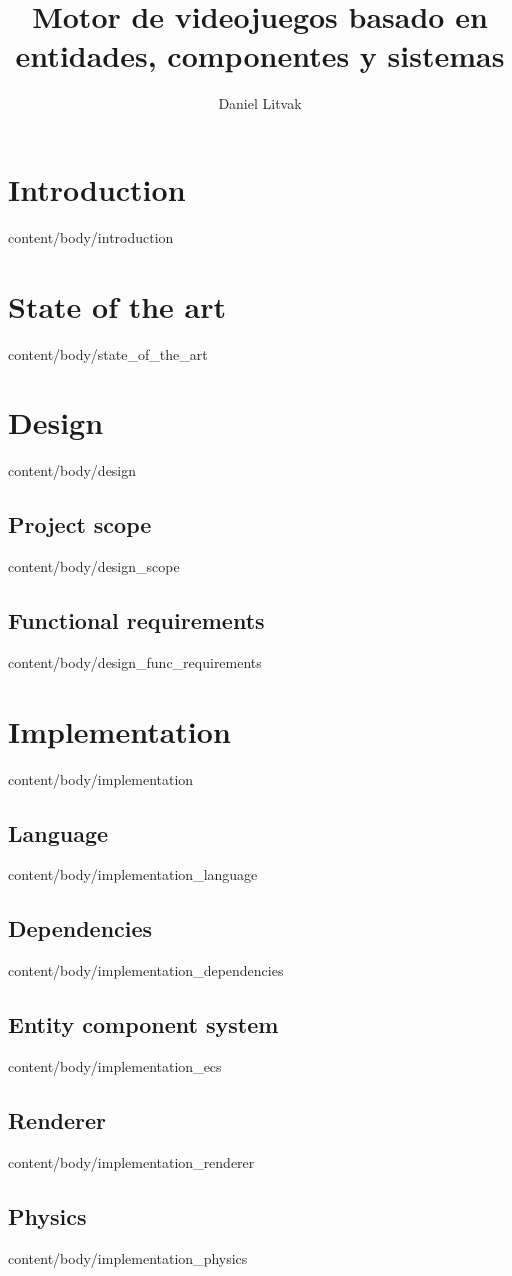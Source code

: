 \documentclass[english, tfg, loc, lof, covers, printable, firstnumbered, epsbased]{tfgtfmthesisuam}
\title{Motor de videojuegos basado en entidades, componentes y sistemas}
\author{Daniel Litvak}
\begin{document}



\chapter{Introduction}{content/body/introduction}

\chapter{State of the art}{content/body/state_of_the_art}

\chapter{Design}{content/body/design}
  \section{Project scope}{content/body/design_scope}
  \section{Functional requirements}{content/body/design_func_requirements}

\chapter{Implementation}{content/body/implementation}
  \section{Language}{content/body/implementation_language}
  \section{Dependencies}{content/body/implementation_dependencies}
  \section{Entity component system}{content/body/implementation_ecs}
  \section{Renderer}{content/body/implementation_renderer}
  \section{Physics}{content/body/implementation_physics}
\end{document}
